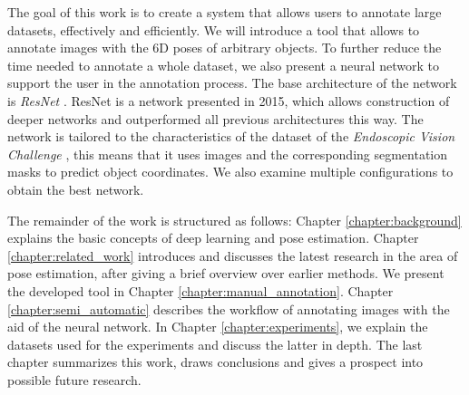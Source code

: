 The goal of this work is to create a system that allows users to annotate large datasets, effectively and efficiently. We will introduce a tool that allows to annotate images with the 6D poses of arbitrary objects. To further reduce the time needed to annotate a whole dataset, we also present a neural network to support the user in the annotation process. The base architecture of the network is \textit{ResNet} \cite{resnet}. ResNet is a network presented in 2015, which allows construction of deeper networks and outperformed all previous architectures this way. The network is tailored to the characteristics of the dataset of the \textit{Endoscopic Vision Challenge} \cite{endovis}, this means that it uses images and the corresponding segmentation masks to predict object coordinates. We also examine multiple configurations to obtain the best network.

The remainder of the work is structured as follows: Chapter \ref{chapter:background} explains the basic concepts of deep learning and pose estimation. Chapter \ref{chapter:related_work} introduces and discusses the latest research in the area of pose estimation, after giving a brief overview over earlier methods. We present the developed tool in Chapter \ref{chapter:manual_annotation}. Chapter \ref{chapter:semi_automatic} describes the workflow of annotating images with the aid of the neural network. In Chapter \ref{chapter:experiments}, we explain the datasets used for the experiments and discuss the latter in depth. The last chapter summarizes this work, draws conclusions and gives a prospect into possible future research.
